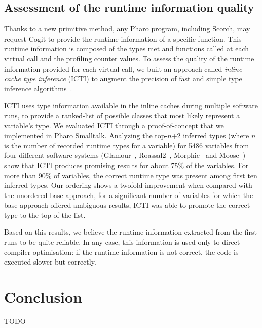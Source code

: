 \documentclass[a4paper,12pt,twoside]{../includes/ThesisStyle}
\begin{document}
\subsection{Assessment of the runtime information quality}

Thanks to a new primitive method, any Pharo program, including Scorch, may request Cogit to provide the runtime information of a specific function. This runtime information is composed of the types met and functions called at each virtual call and the profiling counter values. To assess the quality of the runtime information provided for each virtual call, we built an approach called \emph{inline-cache type inference} (ICTI) to augment the precision of fast and simple type inference algorithms~\cite{Milo16a}. 

ICTI uses type information available in the inline caches during multiple software runs, to provide a ranked-list of possible classes that most likely represent a variable's type. We evaluated ICTI through a proof-of-concept that we implemented in Pharo Smalltalk. Analyzing the top-$n$+2 inferred types (where $n$ is the number of recorded runtime types for a variable) for 5486 variables from four different software systems (Glamour~\cite{Bung09a}, Roassal2~\cite{Pena13a}, Morphic~\cite{Fern07y} and Moose~\cite{Girb10a, Duca05a, Duca00b}) show that ICTI produces promising results for about 75\% of the variables. For more than 90\% of variables, the correct runtime type was present among first ten inferred types. Our ordering shows a twofold improvement when compared with the unordered base approach, \ie for a significant number of variables for which the base approach offered ambiguous results, ICTI was able to promote the correct type to the top of the list.

Based on this results, we believe the runtime information extracted from the first runs to be quite reliable. In any case, this information is used only to direct compiler optimisation: if the runtime information is not correct, the code is executed slower but correctly.


\section*{Conclusion}

TODO

\ifx\wholebook\relax\else
    
\end{document}
